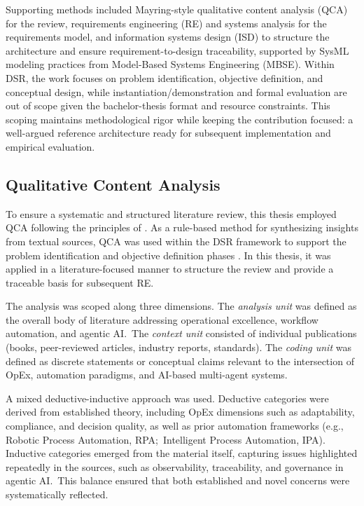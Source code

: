 Supporting methods included Mayring-style qualitative content analysis (QCA) for the review, requirements engineering (RE) and systems analysis for the requirements model, and information systems design (ISD) to structure the architecture and ensure requirement-to-design traceability, supported by SysML modeling practices from Model-Based Systems Engineering (MBSE). Within DSR, the work focuses on problem identification, objective definition, and conceptual design, while instantiation/demonstration and formal evaluation are out of scope given the bachelor-thesis format and resource constraints. This scoping maintains methodological rigor while keeping the contribution focused: a well-argued reference architecture ready for subsequent implementation and empirical evaluation.

\subsection{Qualitative Content Analysis}\label{subsec:qca} %
To ensure a systematic and structured literature review, this thesis employed QCA following the principles of \textcite{mayringQualitative2022}. As a rule-based method for synthesizing insights from textual sources, QCA was used within the DSR framework to support the problem identification and objective definition phases \parencite{hevnerDesign2004,peffersDesign2007}. In this thesis, it was applied in a literature-focused manner to structure the review and provide a traceable basis for subsequent RE.\

The analysis was scoped along three dimensions. The \emph{analysis unit} was defined as the overall body of literature addressing operational excellence, workflow automation, and agentic AI.\ The \emph{context unit} consisted of individual publications (books, peer-reviewed articles, industry reports, standards). The \emph{coding unit} was defined as discrete statements or conceptual claims relevant to the intersection of OpEx, automation paradigms, and AI-based multi-agent systems. 

A mixed deductive-inductive approach was used. Deductive categories were derived from established theory, including OpEx dimensions such as adaptability, compliance, and decision quality, as well as prior automation frameworks (e.g., Robotic Process Automation, RPA;\ Intelligent Process Automation, IPA). Inductive categories emerged from the material itself, capturing issues highlighted repeatedly in the sources, such as observability, traceability, and governance in agentic AI.\ This balance ensured that both established and novel concerns were systematically reflected.

